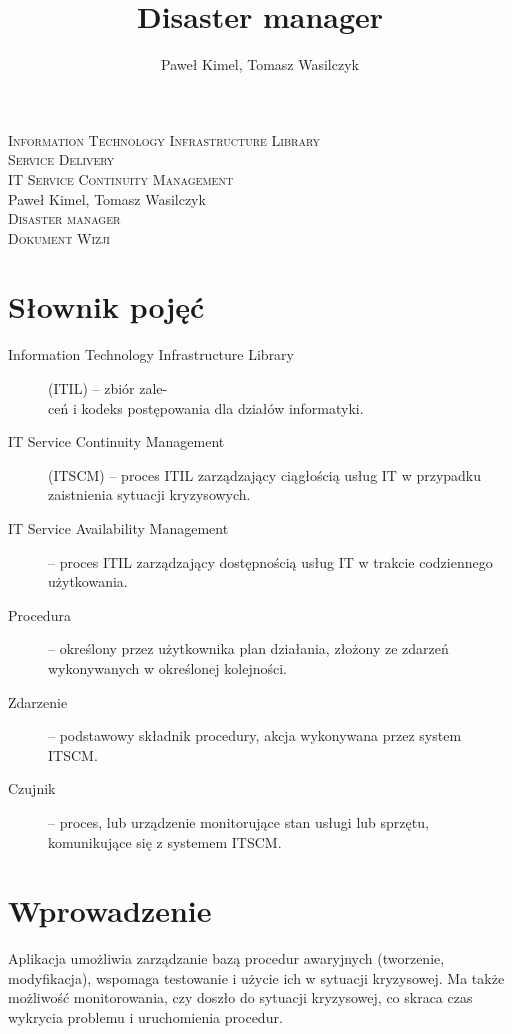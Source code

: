 \documentclass[a4paper,12pt]{article}
\author{Paweł Kimel, Tomasz Wasilczyk}
\title{Disaster manager}
\renewcommand\maketitle
{
	\begin{titlepage}
	\begin{center}
	
	\textsc{Information Technology Infrastructure Library\\Service Delivery\\IT Service Continuity Management}\\[6cm]
	Paweł Kimel, Tomasz Wasilczyk\\[1cm]
	\textsc{\Large Disaster manager}\\[0.25cm]
	\textsc{\large Dokument Wizji}\\[8.675cm]
	
	\end{center}
	\end{titlepage}
}
\begin{document}
\maketitle

\setcounter{page}{2}

\tableofcontents

\break


\section{Słownik pojęć}

\begin{description}

	\item[Information Technology Infrastructure Library] (ITIL) -- zbiór zale-\\ceń i kodeks
	postępowania dla działów informatyki.

	\item[IT Service Continuity Management] (ITSCM) -- proces ITIL zarządzający ciągłością
	usług IT w przypadku zaistnienia sytuacji kryzysowych.

	\item[IT Service Availability Management] -- proces ITIL zarządzający dostępnością
	usług IT w trakcie codziennego użytkowania.

	\item[Procedura] -- określony przez użytkownika plan działania, złożony ze zdarzeń
	wykonywanych w określonej kolejności.

	\item[Zdarzenie] -- podstawowy składnik procedury, akcja wykonywana przez system ITSCM.

	\item[Czujnik] -- proces, lub urządzenie monitorujące stan usługi lub sprzętu,
	komunikujące się z systemem ITSCM.

\end{description}


\section{Wprowadzenie}

Aplikacja umożliwia zarządzanie bazą procedur awaryjnych (tworzenie, modyfikacja), wspomaga testowanie
i użycie ich w sytuacji kryzysowej. Ma także możliwość monitorowania, czy doszło do sytuacji kryzysowej,
co skraca czas wykrycia problemu i uruchomienia procedur.
\end{document}
